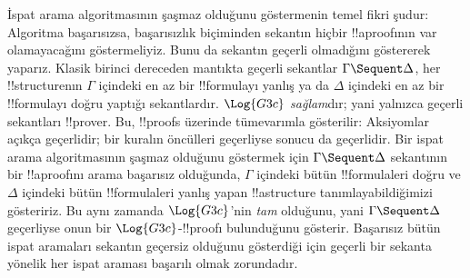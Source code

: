 İspat arama algoritmasının şaşmaz olduğunu göstermenin temel fikri şudur:
Algoritma başarısızsa, başarısızlık biçiminden sekantın hiçbir !!a{proof}{}ının
var olamayacağını göstermeliyiz. Bunu da sekantın geçerli olmadığını göstererek
yaparız. Klasik birinci dereceden mantıkta geçerli sekantlar
$\Gamma \Sequent \Delta$, her !!{structure}{}nın $\Gamma$ içindeki en az bir
!!{formula}{}yı yanlış ya da $\Delta$ içindeki en az bir !!{formula}{}yı doğru
yaptığı sekantlardır. $\Log{G3c}$ \emph{sağlam}dır; yani yalnızca geçerli
sekantları !!{prove}{}r. Bu, !!{proof}s üzerinde tümevarımla gösterilir:
Aksiyomlar açıkça geçerlidir; bir kuralın öncülleri geçerliyse sonucu da
geçerlidir. Bir ispat arama algoritmasının şaşmaz olduğunu göstermek için
$\Gamma \Sequent \Delta$ sekantının bir !!a{proof}{}ını arama başarısız olduğunda,
$\Gamma$ içindeki bütün !!{formula}{}leri doğru ve $\Delta$ içindeki bütün
!!{formula}{}leri yanlış yapan !!a{structure} tanımlayabildiğimizi gösteririz.
Bu aynı zamanda $\Log{G3c}$'nin \emph{tam} olduğunu, yani
$\Gamma \Sequent \Delta$ geçerliyse onun bir $\Log{G3c}$-!!{proof}{}ı
bulunduğunu gösterir. Başarısız bütün ispat aramaları sekantın geçersiz
olduğunu gösterdiği için geçerli bir sekanta yönelik her ispat araması
başarılı olmak zorundadır.

